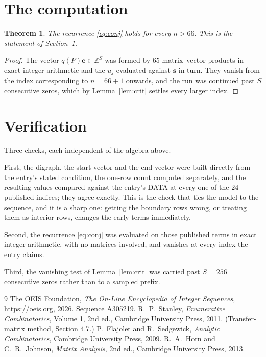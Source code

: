 \documentclass[11pt,a4paper]{article}
\theoremstyle{plain}
\newtheorem{theorem}{Theorem}
\theoremstyle{definition}
\begin{document}
\section{The computation}

\begin{theorem}
The recurrence \eqref{eq:conj} holds for every $n>66$. This is the statement of
Section~1.
\end{theorem}

\begin{proof}
The vector $q(P)\mathbf{e}\in\mathbb{Z}^{S}$ was formed by $65$ matrix--vector
products in exact integer arithmetic and the $u_j$ evaluated against $\mathbf{s}$ in turn.
They vanish from the index corresponding to $n=66+1$ onwards, and the run was continued
past $S$ consecutive zeros, which by Lemma~\ref{lem:crit} settles every larger index.
\end{proof}

\section{Verification}

Three checks, each independent of the algebra above.

First, the digraph, the start vector and the end vector were built directly from the
entry's stated condition, the one-row count computed separately, and the resulting values
compared against the entry's DATA at every one of the $24$ published indices; they
agree exactly. This is the check that ties the model to the sequence, and it is a sharp one:
getting the boundary rows wrong, or treating them as interior rows, changes the early terms
immediately.

Second, the recurrence \eqref{eq:conj} was evaluated on those published terms in exact
integer arithmetic, with no matrices involved, and vanishes at every index the entry claims.

Third, the vanishing test of Lemma~\ref{lem:crit} was carried past $S=256$ consecutive
zeros rather than to a sampled prefix.

\begin{thebibliography}{9}
 The OEIS Foundation, \emph{The On-Line Encyclopedia of Integer
Sequences}, \url{https://oeis.org}, 2026. Sequence A305219.
 R.~P.~Stanley, \emph{Enumerative Combinatorics}, Volume 1, 2nd ed.,
Cambridge University Press, 2011. (Transfer-matrix method, Section 4.7.)
 P.~Flajolet and R.~Sedgewick, \emph{Analytic Combinatorics}, Cambridge
University Press, 2009.
 R.~A.~Horn and C.~R.~Johnson, \emph{Matrix Analysis}, 2nd ed., Cambridge
University Press, 2013.
\end{thebibliography}
\end{document}
